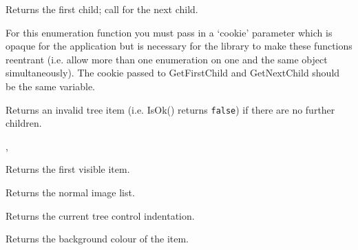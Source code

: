 
Returns the first child; call  for the next child.

For this enumeration function you must pass in a `cookie' parameter
which is opaque for the application but is necessary for the library
to make these functions reentrant (i.e. allow more than one
enumeration on one and the same object simultaneously). The cookie passed to
GetFirstChild and GetNextChild should be the same variable.

Returns an invalid tree item (i.e. IsOk() returns {\tt false}) if there are no further children.


,




\label{wxtreectrlgetfirstvisibleitem}


Returns the first visible item.


\label{wxtreectrlgetimagelist}


Returns the normal image list.


\label{wxtreectrlgetindent}


Returns the current tree control indentation.


\label{wxtreectrlgetitembackgroundcolour}


Returns the background colour of the item.


\label{wxtreectrlgetitemdata}


